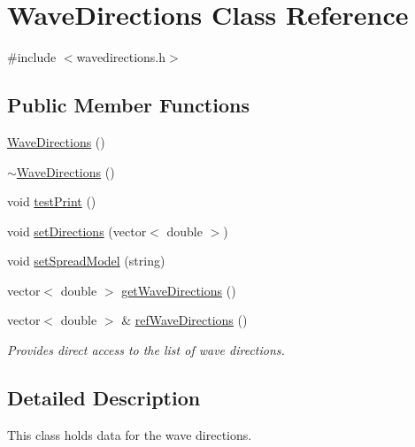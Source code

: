 \hypertarget{class_wave_directions}{\section{Wave\-Directions Class Reference}
\label{class_wave_directions}
}


{\ttfamily \#include $<$wavedirections.\-h$>$}

\subsection*{Public Member Functions}
\begin{DoxyCompactItemize}
\item 
\hyperlink{class_wave_directions_a7d754155f7d3f22bae9224dd292bb32f}{Wave\-Directions} ()
\item 
\hyperlink{class_wave_directions_a44c089a84a0f32128e3936244486c79c}{$\sim$\-Wave\-Directions} ()
\item 
void \hyperlink{class_wave_directions_a4f2850568a41b6edfac8b74da9ef3283}{test\-Print} ()
\item 
void \hyperlink{class_wave_directions_a83344e448693bff3d145bce0f9e44fc3}{set\-Directions} (vector$<$ double $>$)
\item 
void \hyperlink{class_wave_directions_a42f3f43f6c9098abc42a327c5837b7c8}{set\-Spread\-Model} (string)
\item 
vector$<$ double $>$ \hyperlink{class_wave_directions_a064919ae735253384829adccdefffc60}{get\-Wave\-Directions} ()
\item 
vector$<$ double $>$ \& \hyperlink{class_wave_directions_aaebd8fa635ede430b49b8c920832d87b}{ref\-Wave\-Directions} ()
\begin{DoxyCompactList}\small\item\em Provides direct access to the list of wave directions. \end{DoxyCompactList}\end{DoxyCompactItemize}


\subsection{Detailed Description}
This class holds data for the wave directions. 


